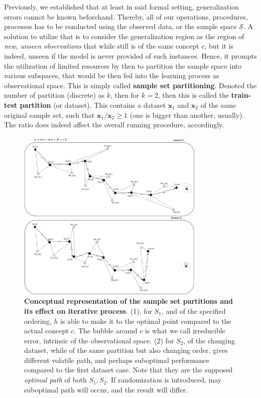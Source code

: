 Previously, we established that at least in said formal setting, generalization errors cannot be known beforehand. Thereby, all of our operations, procedures, processes has to be conducted using the observed data, or the sample space $\mathcal{S}$. A solution to utilize that is to consider the generalization region as the region of \textit{new, unseen observations} that while still is of the same concept $c$, but it is indeed, unseen if the model is never provided of such instances. Hence, it prompts the utilization of limited resources by then to partition the sample space into various subspaces, that would be then fed into the learning process as observational space. This is simply called \textbf{sample set partitioning}. Denoted the number of partition (discrete) as $k$, then for $k=2$, then this is called the \textbf{train-test partition} (or dataset). This contains a dataset $\mathbf{x}_{1}$ and $\mathbf{x}_{2}$ of the same original sample set, such that $\mathbf{x}_{1}/\mathbf{x}_{2}\geq 1$ (one is bigger than another, usually). The ratio does indeed affect the overall running procedure, accordingly.
\begin{figure}[htb]
    \centering
    \includegraphics[width=0.8\textwidth]{img/optimization_train_loss_data.png}
    \caption{\textbf{Conceptual representation of the sample set partitions and its effect on iterative process}. (1), for $S_{1}$, and of the specified ordering, $h$ is able to make it to the optimal point compared to the actual concept $c$. The bubble around $c$ is what we call irreducible error, intrinsic of the observational space. (2) for $S_{2}$, of the changing dataset, while of the same partition but also changing order, gives different volatile path, and perhaps suboptimal performance compared to the first dataset case. Note that they are the supposed \textit{optimal path} of both $S_{1},S_{2}$. If randomization is introduced, may suboptimal path will occur, and the result will differ.}
    \label{fig:randomwalk_descent}
\end{figure}

